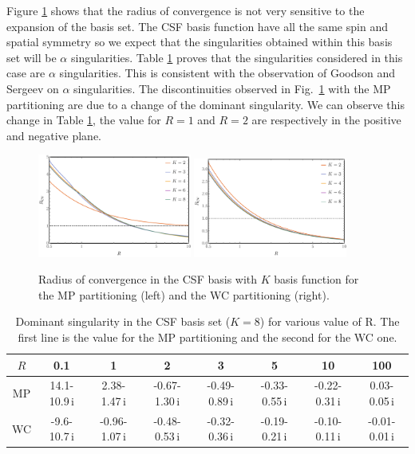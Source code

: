 \documentclass[11pt,a4paper]{article}
\begin{document}
Figure \ref{fig:RadiusBasis} shows that the radius of convergence is not very sensitive to the expansion of the basis set. The CSF basis function have all the same spin and spatial symmetry so we expect that the singularities obtained within this basis set will be $\alpha$ singularities. Table \ref{tab:SingAlpha} proves that the singularities considered in this case are $\alpha$ singularities. This is consistent with the observation of Goodson and Sergeev \cite{Goodson_2004} on $\alpha$ singularities. The discontinuities observed in Fig.~\ref{fig:RadiusBasis} with the MP partitioning are due to a change of the dominant singularity. We can observe this change in Table \ref{tab:SingAlpha}, the value for $R=1$ and $R=2$ are respectively in the positive and negative plane.

\begin{figure}[h!]
    \centering
    \includegraphics[width=0.45\textwidth]{MPlargebasis.pdf}
    \includegraphics[width=0.45\textwidth]{WCElargebasis.pdf}
    \caption{\centering Radius of convergence in the CSF basis with $K$ basis function for the MP partitioning (left) and the WC partitioning (right).}
    \label{fig:RadiusBasis}
\end{figure}

\begin{table}[h!]
\centering
\caption{\centering Dominant singularity in the CSF basis set ($K=8$) for various value of R. The first line is the value for the MP partitioning and the second for the WC one.}
\begin{tabular}{cccccccc}
\hline
\hline
$R$ & 0.1 & 1 & 2 & 3 & 5 & 10 & 100 \\
\hline
MP & 14.1-10.9\,i & 2.38-1.47\,i & -0.67-1.30\,i & -0.49-0.89\,i & -0.33-0.55\,i & -0.22-0.31\,i & 0.03-0.05\,i \\
WC & -9.6-10.7\,i & -0.96-1.07\,i & -0.48-0.53\,i & -0.32-0.36\,i & -0.19-0.21\,i & -0.10-0.11\,i & -0.01-0.01\,i \\
\hline
\hline
\end{tabular}
\label{tab:SingAlpha}
\end{table}
\end{document}
